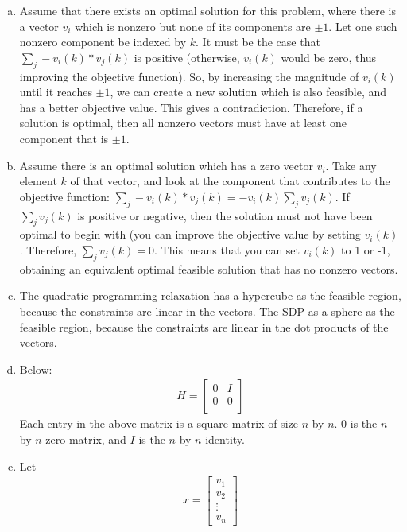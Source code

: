 \documentclass[fleqn]{homework}
\begin{document}
\begin{problem}{3}
    \begin{enumerate}[a.]
    \item Assume that there exists an optimal solution for this problem, where
      there is a vector $v_i$ which is nonzero but none of its components are
      $\pm 1$.  Let one such nonzero component be indexed by $k$.  It must be
      the case that $\sum_{j} -v_i(k) * v_j(k)$ is positive (otherwise,
      $v_{i}(k)$ would be zero, thus improving the objective function).  So, by
      increasing the magnitude of $v_i(k)$ until it reaches $\pm 1$, we can
      create a new solution which is also feasible, and has a better objective
      value.  This gives a contradiction.  Therefore, if a solution is optimal,
      then all nonzero vectors must have at least one component that is $\pm 1$.
    \item Assume there is an optimal solution which has a zero vector $v_i$.
      Take any element $k$ of that vector, and look at the component that
      contributes to the objective function:
      $\sum_{j} - v_i(k) * v_j(k) = - v_i(k) \sum_{j} v_j(k)$.  If
      $\sum_{j} v_j(k)$ is positive or negative, then the solution must not have
      been optimal to begin with (you can improve the objective value by setting
      $v_i(k)$.  Therefore, $\sum_{j} v_j(k) = 0$.  This means that you can set
      $v_i(k)$ to 1 or -1, obtaining an equivalent optimal feasible solution
      that has no nonzero vectors.
    \item The quadratic programming relaxation has a hypercube as the feasible
      region, because the constraints are linear in the vectors.  The SDP as a
      sphere as the feasible region, because the constraints are linear in the
      dot products of the vectors.
    \item Below:
      \begin{align*}
        H = \begin{bmatrix*} 
          0 & I \\
          0 & 0 \\
        \end{bmatrix*}
      \end{align*}
      Each entry in the above matrix is a square matrix of size $n$ by $n$.  0
      is the $n$ by $n$ zero matrix, and $I$ is the $n$ by $n$ identity.
    \item Let
      \begin{align*}
        x = \begin{bmatrix*} v_1 \\ v_2 \\ \vdots \\ v_n \end{bmatrix*}
      \end{align*}


\end{enumerate}
\end{problem}
\end{document}
